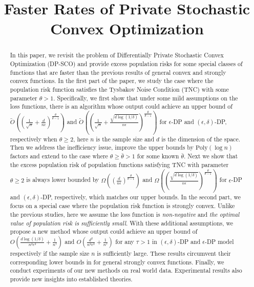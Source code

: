 \documentclass[12pt]{alt2022} %
\title[Faster Rates of DP-SCO]{Faster Rates of Private Stochastic Convex Optimization}
\renewcommand{\tilde}{\widetilde}
\begin{document}
\maketitle

\begin{abstract}
   In this paper, we revisit the problem of Differentially Private Stochastic Convex Optimization (DP-SCO) and provide excess population risks for some special classes of functions that are faster than the previous results of general convex and strongly convex functions. In the first part of the paper, we study the case where the population risk function satisfies the Tysbakov Noise Condition (TNC) with some parameter $\theta>1$. Specifically, we first show that under some mild assumptions on the loss functions, there is an algorithm whose output could achieve an upper bound of $\tilde{O}((\frac{1}{\sqrt{n}}+\frac{d}{n\epsilon})^\frac{\theta}{\theta-1}) $ and $\tilde{O}((\frac{1}{\sqrt{n}}+\frac{\sqrt{d\log(1/\delta)}}{n\epsilon})^\frac{\theta}{\theta-1})$ for $\epsilon$-DP and $(\epsilon, \delta)$-DP, respectively when $\theta\geq 2$, here $n$ is the sample size and $d$ is the dimension of the space. Then we address the inefficiency issue, improve the upper bounds by $\text{Poly}(\log n)$ factors and extend to the case where $\theta\geq \bar{\theta}>1$ for some known $\bar{\theta}$. Next we show that the excess population risk of population functions satisfying TNC with parameter $\theta\geq 2$ is always lower bounded by  $\Omega((\frac{d}{n\epsilon})^\frac{\theta}{\theta-1}) $ and $\Omega((\frac{\sqrt{d\log(1/\delta)}}{n\epsilon})^\frac{\theta}{\theta-1})$ for $\epsilon$-DP and $(\epsilon, \delta)$-DP, respectively, which matches our upper bounds. In the second part, we focus on a special case where the population risk function is strongly convex. Unlike the previous studies, here we assume the loss function is {\em non-negative} and {\em the optimal value of population risk is sufficiently small}. With these additional assumptions, we propose a new method whose output could achieve an upper bound of $O(\frac{d\log(1/\delta)}{n^2\epsilon^2}+\frac{1}{n^{\tau}})$ and $O(\frac{d^2}{n^2\epsilon^2}+\frac{1}{n^{\tau}})$ for any $\tau> 1$ in $(\epsilon,\delta)$-DP and $\epsilon$-DP model respectively if the sample size $n$ is sufficiently large. These results circumvent their corresponding lower bounds in \citep{feldman2020private} for general strongly convex functions.   Finally, we conduct experiments of our new methods on real world data. Experimental results also provide new insights into established theories.
\end{abstract}
\end{document}
